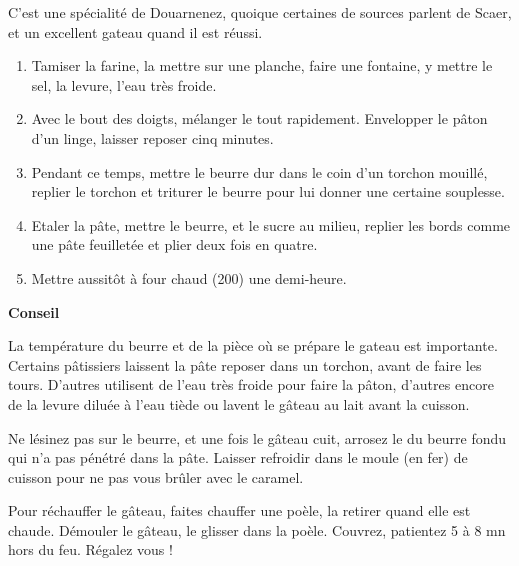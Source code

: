 
C'est une sp\'ecialit\'e de Douarnenez, quoique certaines de sources
parlent de Scaer, et un excellent gateau quand il est r\'eussi.

\begin{ingredients}
\end{ingredients}


\begin{recipe}
  \begin{enumerate}

  \item Tamiser la farine, la mettre sur une planche, faire une
    fontaine, y mettre le sel, la levure, l'eau tr\`es froide.

  \item Avec le bout des doigts, m\'elanger le tout
    rapidement. Envelopper le p\^aton d'un linge, laisser reposer cinq
    minutes.

  \item Pendant ce temps, mettre le beurre dur dans le coin d'un
    torchon mouill\'e, replier le torchon et triturer le beurre pour lui
    donner une certaine souplesse.

  \item Etaler la p\^ate, mettre le beurre, et le sucre au milieu,
    replier les bords comme une p\^ate feuillet\'ee et plier deux fois en
    quatre.

  \item Mettre aussit\^ot \`a four chaud (200\C) une demi-heure.

  \end{enumerate}

  \textbf{Conseil}

  La temp\'erature du beurre et de la pi\`ece o\`u se pr\'epare le gateau est
  importante. Certains p\^atissiers laissent la p\^ate reposer dans un
  torchon, avant de faire les tours. D'autres utilisent de l'eau tr\`es
  froide pour faire la p\^aton, d'autres encore de la levure dilu\'ee \`a
  l'eau ti\`ede ou lavent le g\^ateau au lait avant la cuisson.

  Ne l\'esinez pas sur le beurre, et une fois le g\^ateau cuit, arrosez le
  du beurre fondu qui n'a pas p\'en\'etr\'e dans la p\^ate. Laisser refroidir
  dans le moule (en fer) de cuisson pour ne pas vous br\^uler avec le
  caramel.

  Pour r\'echauffer le g\^ateau, faites chauffer une po\`ele, la retirer
  quand elle est chaude. D\'emouler le g\^ateau, le glisser dans la
  po\`ele. Couvrez, patientez 5 \`a 8 mn hors du feu. R\'egalez vous !

\end{recipe}
